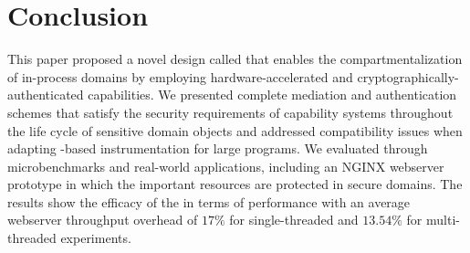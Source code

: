 \section{Conclusion}
This paper proposed a novel design called \thename that enables the compartmentalization of in-process domains by employing hardware-accelerated and cryptographically-authenticated capabilities.
We presented complete mediation and authentication schemes that satisfy the security requirements of capability systems throughout the life cycle of sensitive domain objects and addressed compatibility issues when adapting \pamte-based instrumentation for large programs.
We evaluated \thename through microbenchmarks and real-world applications, including an NGINX webserver prototype in which the important resources are protected in secure domains.
The results show the efficacy of \thename the in terms of performance with an average webserver throughput overhead of $17\%$ for single-threaded and $13.54\%$ for multi-threaded experiments.

